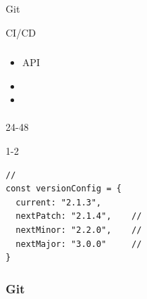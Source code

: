 \important{}

\important{}Git

\important{}CI/CD

\important{}

\hypertarget{section-76}{%
\subsubsection{}\label{section-76}}

\hypertarget{section-77}{%
\paragraph{}\label{section-77}}


\begin{itemize}
\item
  API
\item
\item
\end{itemize}

\important{}

\hypertarget{section-78}{%
\paragraph{}\label{section-78}}

\important{}24-48

\important{}

\important{}1-2

\begin{lstlisting}[style=javascript]
// 
const versionConfig = {
  current: "2.1.3",
  nextPatch: "2.1.4",    // 
  nextMinor: "2.2.0",    //   
  nextMajor: "3.0.0"     // 
}
\end{lstlisting}

\hypertarget{git}{%
\subsubsection{Git}\label{git}}

\hypertarget{section-79}{%
\paragraph{}\label{section-79}}

\important{}\important{}

